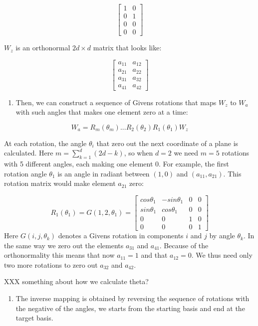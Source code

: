 \[ \begin{bmatrix}1 & 0 \\0  &1 \\ 0&0 \\0&0\end{bmatrix} \]

\(W_z\) is an orthonormal \(2d\times d\) matrix that looks like:

\[ \begin{bmatrix} a_{11} & a_{12} \\a_{21}  &a_{22} \\ a_{31}&a_{32} \\a_{41}&a_{42}\end{bmatrix} \]

\begin{enumerate}
\def\labelenumi{\arabic{enumi}.}
\setcounter{enumi}{2}
\tightlist
\item
  Then, we can construct a sequence of Givens rotations that maps \(W_z\) to \(W_a\) with such angles that makes one element zero at a time:
\end{enumerate}

\[ W_a = R_m(\theta_m) ... R_2(\theta_2)R_1(\theta_1)W_z\]

At each rotation, the angle \(\theta_i\) that zero out the next coordinate of a plane is calculated. Here \(m = \sum_{k=1}^d (2d - k)\), so when \(d=2\) we need \(m=5\) rotations with 5 different angles, each making one element 0. For example, the first rotation angle \(\theta_1\) is an angle in radiant between \((1, 0)\) and \((a_{11}, a_{21})\). This rotation matrix would make element \(a_{21}\) zero:

\[R_1(\theta_1) = G(1, 2, \theta_1) = \begin{bmatrix} cos\theta_1 & -sin\theta_1 & 0 & 0 \\sin\theta_1  &cos\theta_1 & 0 &0 \\ 0&0&1&0 \\0&0&0&1\end{bmatrix}\]
Here \(G(i,j,\theta_k)\) denotes a Givens rotation in components \(i\) and \(j\) by angle \(\theta_k\).
In the same way we zero out the elements \(a_{31}\) and \(a_{41}\). Because of the orthonormality this means that now \(a_{11} = 1\) and that \(a_{12} = 0\). We thus need only two more rotations to zero out \(a_{32}\) and \(a_{42}\).

XXX something about how we calculate theta?

\begin{enumerate}
\def\labelenumi{\arabic{enumi}.}
\setcounter{enumi}{3}
\tightlist
\item
  The inverse mapping is obtained by reversing the sequence of rotations with the negative of the angles, we starts from the starting basis and end at the target basis.
\end{enumerate}

